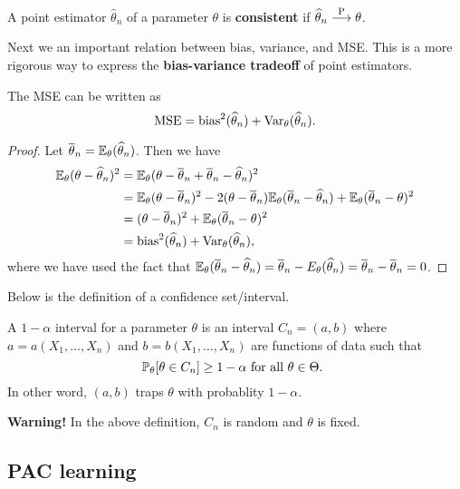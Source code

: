 \documentclass[a4paper]{article}
\begin{document}
\begin{defi}
  A point estimator $\hat\theta_n$ of a parameter
  $\theta$ is \textbf{consistent} if $\hat{\theta}_n 
  \convProb \theta$.
\end{defi}

Next we an important relation between bias, variance, 
and MSE. This is a more rigorous way to express the
\textbf{bias-variance tradeoff} of point estimators.

\begin{thm}
The MSE can be written as 
\[
\mse = \bias^2 (\hat{\theta}_n) + \var_\theta (\hat{\theta}_n).
\]
\end{thm}

\begin{proof}
  Let $\bar{\theta}_n = \E_\theta (\hat{\theta}_n)$. 
  Then we have 
  \[
  \begin{aligned}
    \E_\theta(\theta - \hat{\theta}_n)^2 
    &= \E_\theta(\theta - \bar{\theta}_n + \bar{\theta}_n 
    - \hat{\theta}_n)^2 \\
    &= \E_\theta(\theta - \bar{\theta}_n)^2 
    - 2 (\theta - \bar{\theta}_n) \E_\theta (\bar{\theta}_n - 
    \hat{\theta}_n)
    + \E_\theta (\bar{\theta}_n - \theta)^2 \\
    &= (\theta - \bar{\theta}_n)^2 
    + \E_\theta (\bar{\theta}_n - \theta)^2 \\
    &= \bias^2(\hat{\theta}_n) + \var_\theta (\hat{\theta}_n),
  \end{aligned}
  \]
  where we have used the fact that 
  $\E_\theta (\bar{\theta}_n - 
  \hat{\theta}_n) = \bar{\theta}_n - E_\theta(\hat{\theta}_n)
  = \bar{\theta}_n - \bar{\theta}_n = 0$.
\end{proof}

Below is the definition of a confidence set/interval.

\begin{defi}
  A $1 - \alpha$ interval for a parameter $\theta$ is 
  an interval $C_n = (a, b)$ where 
  $a = a(X_1, \dots, X_n)$ and $b = b(X_1, \dots, X_n)$
  are functions of data such that 
  \[
  \P_\theta[\theta \in C_n] \geq 1 - \alpha 
  \text{ for all $\theta \in \Theta$. }
  \]
  In other word, $(a, b)$ traps $\theta$ with probablity 
  $1 - \alpha$. 
\end{defi}

\textbf{Warning!} In the above definition, 
$C_n$ is random and $\theta$ is fixed.

\subsection{PAC learning}
\end{document}
